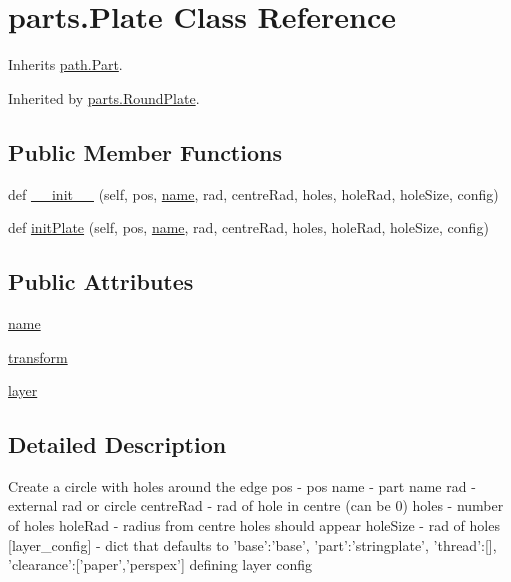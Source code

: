 \hypertarget{classparts_1_1_plate}{}\section{parts.\+Plate Class Reference}
\label{classparts_1_1_plate}


Inherits \hyperlink{classpath_1_1_part}{path.\+Part}.



Inherited by \hyperlink{classparts_1_1_round_plate}{parts.\+Round\+Plate}.

\subsection*{Public Member Functions}
\begin{DoxyCompactItemize}
\item 
def \hyperlink{classparts_1_1_plate_a17ed7b9a3e147b3403aaae271692076c}{\+\_\+\+\_\+init\+\_\+\+\_\+} (self, pos, \hyperlink{classparts_1_1_plate_a23ed4bbfbfe13a065a06ba86521525a2}{name}, rad, centre\+Rad, holes, hole\+Rad, hole\+Size, config)
\item 
def \hyperlink{classparts_1_1_plate_a5d76345ac0bf7bf9e27cdfa501292a62}{init\+Plate} (self, pos, \hyperlink{classparts_1_1_plate_a23ed4bbfbfe13a065a06ba86521525a2}{name}, rad, centre\+Rad, holes, hole\+Rad, hole\+Size, config)
\end{DoxyCompactItemize}
\subsection*{Public Attributes}
\begin{DoxyCompactItemize}
\item 
\hyperlink{classparts_1_1_plate_a23ed4bbfbfe13a065a06ba86521525a2}{name}
\item 
\hyperlink{classparts_1_1_plate_a7a97307757824cf574eb989e06b0eeb4}{transform}
\item 
\hyperlink{classparts_1_1_plate_a2f319734232a2fc2a61e4fc3c23e973a}{layer}
\end{DoxyCompactItemize}


\subsection{Detailed Description}
\begin{DoxyVerb}    Create a circle with holes around the edge
    pos - pos
    name - part name
    rad - external rad or circle
    centreRad - rad of hole in centre (can be 0)
    holes - number of holes
    holeRad - radius from centre holes should appear
    holeSize - rad of holes
    [layer_config] - dict that defaults to {'base':'base', 'part':'stringplate', 'thread':[], 'clearance':['paper','perspex']} defining layer config
\end{DoxyVerb}
 

